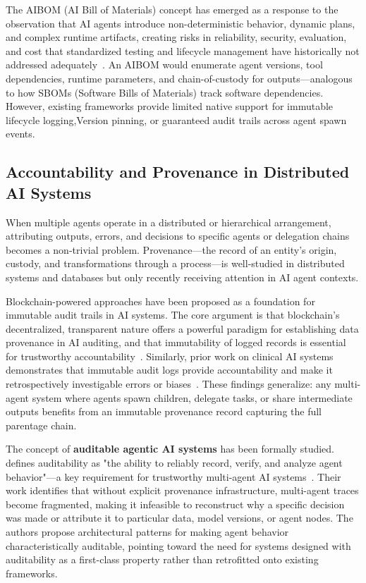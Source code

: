 The AIBOM (AI Bill of Materials) concept has emerged as a response to the observation that AI agents introduce non-deterministic behavior, dynamic plans, and complex runtime artifacts, creating risks in reliability, security, evaluation, and cost that standardized testing and lifecycle management have historically not addressed adequately~\cite{infosys_agentic}. An AIBOM would enumerate agent versions, tool dependencies, runtime parameters, and chain-of-custody for outputs—analogous to how SBOMs (Software Bills of Materials) track software dependencies. However, existing frameworks provide limited native support for immutable lifecycle logging,Version pinning, or guaranteed audit trails across agent spawn events.

\subsection{Accountability and Provenance in Distributed AI Systems}

When multiple agents operate in a distributed or hierarchical arrangement, attributing outputs, errors, and decisions to specific agents or delegation chains becomes a non-trivial problem. Provenance—the record of an entity's origin, custody, and transformations through a process—is well-studied in distributed systems and databases but only recently receiving attention in AI agent contexts.

Blockchain-powered approaches have been proposed as a foundation for immutable audit trails in AI systems. The core argument is that blockchain's decentralized, transparent nature offers a powerful paradigm for establishing data provenance in AI auditing, and that immutability of logged records is essential for trustworthy accountability~\cite{blockchain_ai_audits}. Similarly, prior work on clinical AI systems demonstrates that immutable audit logs provide accountability and make it retrospectively investigable errors or biases~\cite{joseph_2023_provenance}. These findings generalize: any multi-agent system where agents spawn children, delegate tasks, or share intermediate outputs benefits from an immutable provenance record capturing the full parentage chain.

The concept of \textbf{auditable agentic AI systems} has been formally studied. \citeauthor{dl_acm_auditable} defines auditability as "the ability to reliably record, verify, and analyze agent behavior"—a key requirement for trustworthy multi-agent AI systems~\cite{dl_acm_auditable}. Their work identifies that without explicit provenance infrastructure, multi-agent traces become fragmented, making it infeasible to reconstruct why a specific decision was made or attribute it to particular data, model versions, or agent nodes. The authors propose architectural patterns for making agent behavior characteristically auditable, pointing toward the need for systems designed with auditability as a first-class property rather than retrofitted onto existing frameworks.


